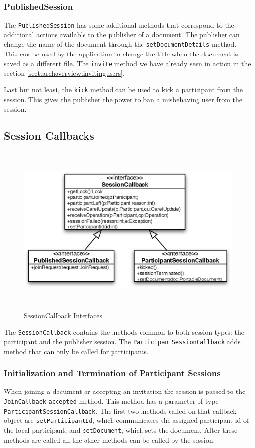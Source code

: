 \subsubsection{PublishedSession}
The \texttt{Published\-Session} has some additional methods that correspond
to the additional actions available to the publisher of a document. The
publisher can change the name of the document through the
\texttt{set\-Document\-Details} method. This can be used by the application
to change the title when the document is saved as a different file.
The \texttt{invite} method we have already seen in action in the section
\ref{sect:archoverview.invitingusers}.

Last but not least, the \texttt{kick} method can be used to kick a
participant from the session. This gives the publisher the power to
ban a misbehaving user from the session.


\subsection{Session Callbacks}
\begin{figure}[H]
 \centering
 \includegraphics[width=14.89cm,height=8.47cm]{../images/finalreport/architecture_sessioncallback_uml.eps}
 \caption{SessionCallback Interfaces}
 \label{fig:archoverview.sessioncallback}
\end{figure}

The \texttt{SessionCallback} contains the methods common to both session types:
the participant and the publisher session. The 
\texttt{ParticipantSessionCallback} adds method that can only be called for
participants.


\subsubsection{Initialization and Termination of Participant Sessions}
When joining a document or accepting an invitation the session is passed to
the \texttt{JoinCallback} \texttt{accepted} method. This method has a
parameter of type \texttt{ParticipantSessionCallback}. The first two
methods called on that callback object are \texttt{setParticipantId}, which 
communicates the assigned participant id of the local participant, and 
\texttt{setDocument}, which sets the document. After these methods are called
all the other methods can be called by the session.

